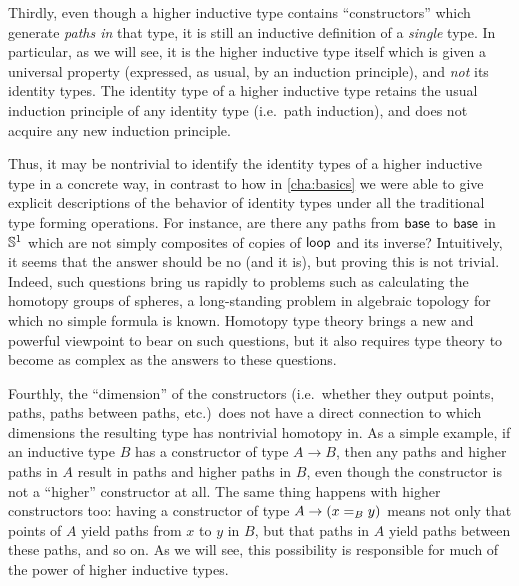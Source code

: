 Thirdly, even though a higher inductive type contains ``constructors'' which generate \emph{paths in} that type, it is still an inductive definition of a \emph{single} type.
In particular, as we will see, it is the higher inductive type itself which is given a universal property (expressed, as usual, by an induction principle), and \emph{not} its identity types.
The identity type of a higher inductive type retains the usual induction principle of any identity type (i.e.\ path induction), and does not acquire any new induction principle.

Thus, it may be nontrivial to identify the identity types of a higher inductive type in a concrete way, in contrast to how in \cref{cha:basics} we were able to give explicit descriptions of the behavior of identity types under all the traditional type forming operations.
For instance, are there any paths from $\base$ to $\base$ in $\Sn^1$ which are not simply composites of copies of $\lloop$ and its inverse?
Intuitively, it seems that the answer should be no (and it is), but proving this is not trivial.
Indeed, such questions bring us rapidly to problems such as calculating the homotopy groups of spheres, a long-standing problem in algebraic topology for which no simple formula is known.
Homotopy type theory brings a new and powerful viewpoint to bear on such questions, but it also requires type theory to become as complex as the answers to these questions.

%
Fourthly, the ``dimension'' of the constructors (i.e.\ whether they output points, paths, paths between paths, etc.)\ does not have a direct connection to which dimensions the resulting type has nontrivial homotopy in.
As a simple example, if an inductive type $B$ has a constructor of type $A\to B$, then any paths and higher paths in $A$ result in paths and higher paths in $B$, even though the constructor is not a ``higher'' constructor at all.
The same thing happens with higher constructors too: having a constructor of type $A\to (\id[B]xy)$ means not only that points of $A$ yield paths from $x$ to $y$ in $B$, but that paths in $A$ yield paths between these paths, and so on.
As we will see, this possibility is responsible for much of the power of higher inductive types.

